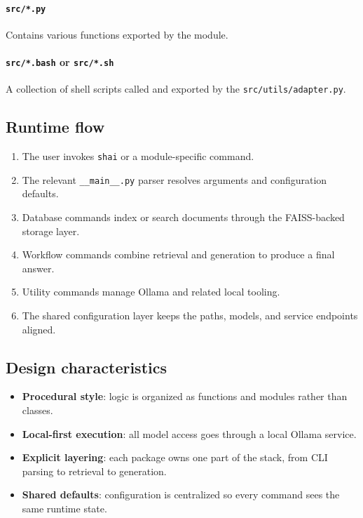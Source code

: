 \paragraph{\texttt{src/*.py}}
Contains various functions exported by the module.

\paragraph{\texttt{src/*.bash} or \texttt{src/*.sh}}
A collection of shell scripts called and exported by the
\texttt{src/utils/adapter.py}.


\subsection*{Runtime flow}

\begin{enumerate}
    \item The user invokes \texttt{shai} or a module-specific command.
    \item The relevant \texttt{\_\_main\_\_.py} parser resolves arguments and configuration defaults.
    \item Database commands index or search documents through the FAISS-backed storage layer.
    \item Workflow commands combine retrieval and generation to produce a final answer.
    \item Utility commands manage Ollama and related local tooling.
    \item The shared configuration layer keeps the paths, models, and service endpoints aligned.
\end{enumerate}


\subsection*{Design characteristics}

\begin{itemize}
    \item \textbf{Procedural style}: logic is organized as functions and modules rather than classes.
    \item \textbf{Local-first execution}: all model access goes through a local Ollama service.
    \item \textbf{Explicit layering}: each package owns one part of the stack, from CLI parsing to
    retrieval to generation.
    \item \textbf{Shared defaults}: configuration is centralized so every command sees the same runtime
    state.
\end{itemize}
